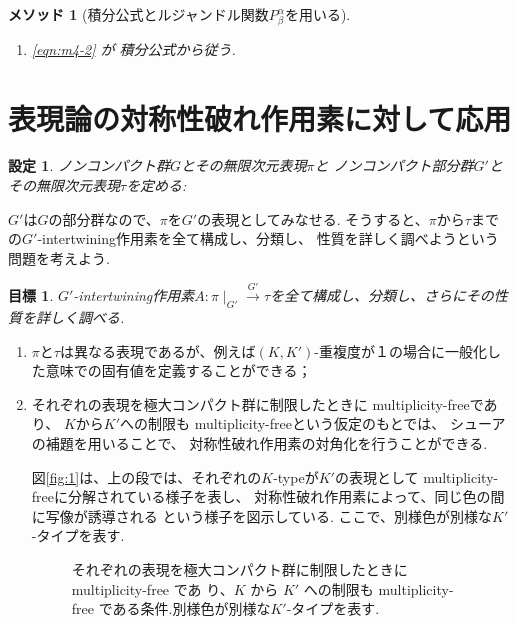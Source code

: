 \documentclass[12pt]{article} %
\newcommand{\kana}[2]{#1}
\newtheorem*{setting*}{\textbf{設定}}
\newtheorem*{goal*}{\textbf{目標}}
\newtheorem{method}{\textbf{メソッド}}
\theoremstyle{remark}
\begin{document}
{\begin{method}[積分公式とルジャンドル関数$ P^\alpha_\beta$を用いる]
\begin{enumerate}
		\item \eqref{eqn:m4-2} が \cite[L2]{kobayashi2011schrodinger}積分公式から従う.
	\end{enumerate}
\end{method}
\section{表現論の対称性破れ作用素に対して応用}
\newcommand{\mysbo}{A:\pi\mid_{G'}\xrightarrow{G'}\tau}
	\begin{setting*}
ノンコンパクト群$G$とその無限次元表現$\pi$と
ノンコンパクト部分群$G'$とその無限次元表現$\tau$を定める:\\
	\centerline{
		\xymatrixcolsep{0.5pc}
		\xymatrixrowsep{1pc}
		}
	\end{setting*}
$G'$は$G$の部分群なので、$\pi$を$G'$の表現としてみなせる.
そうすると、$\pi$から$\tau$までの$G'$-intertwining作用素を全て構成し、分類し、
性質を詳しく調べようという問題を考えよう.
	\begin{goal*}
		$G'$-intertwining作用素$\mysbo$を全て構成し、分類し、さらにその性質を詳しく調べる.
	\end{goal*}
	\begin{enumerate}
		\item $\pi$と$\tau$は異なる表現であるが、例えば$(K,K')$-重複度が１の場合に一般化した意味での固有値を定義することができる；
		\item
それぞれの表現を極大コンパクト群に制限したときに
multiplicity-freeであり、
$K$から$K'$への制限も multiplicity-freeという仮定のもとでは、
シューアの補題を用いることで、
対称性破れ作用素の\kana{対角化}{タイカクカ}を行うことができる.

図\ref{fig:1}は、上の段では、それぞれの$K$-typeが$K'$の表現として
multiplicity-freeに分解されている様子を表し、
対称性破れ作用素によって、同じ色の間に写像が誘導される
という様子を\kana{図示}{ずし}している.
ここで、別様色が別様な$K'$-タイプを表す.
\begin{figure}[h]
	\centering
	\begin{tikzpicture}[rotate=-90,scale=2]
	
	\end{tikzpicture}%
	\caption{
	それぞれの表現を極大コンパクト群に制限したときに multiplicity-free であ り、$K$ から $K'$ への制限も multiplicity-free
	である条件.別様色が別様な$K'$-タイプを表す.}


\end{figure}
\end{enumerate}}
\end{document}
